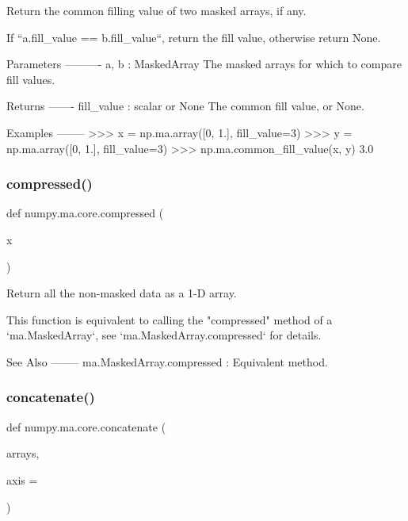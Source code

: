 \begin{DoxyVerb}Return the common filling value of two masked arrays, if any.

If ``a.fill_value == b.fill_value``, return the fill value,
otherwise return None.

Parameters
----------
a, b : MaskedArray
    The masked arrays for which to compare fill values.

Returns
-------
fill_value : scalar or None
    The common fill value, or None.

Examples
--------
>>> x = np.ma.array([0, 1.], fill_value=3)
>>> y = np.ma.array([0, 1.], fill_value=3)
>>> np.ma.common_fill_value(x, y)
3.0\end{DoxyVerb}
 \mbox{\label{namespacenumpy_1_1ma_1_1core_a2b4b4b816bb642b0b523350e0857a255}} 
\subsubsection{\texorpdfstring{compressed()}{compressed()}}
{\footnotesize\ttfamily def numpy.\+ma.\+core.\+compressed (\begin{DoxyParamCaption}\item[{}]{x }\end{DoxyParamCaption})}

\begin{DoxyVerb}Return all the non-masked data as a 1-D array.

This function is equivalent to calling the "compressed" method of a
`ma.MaskedArray`, see `ma.MaskedArray.compressed` for details.

See Also
--------
ma.MaskedArray.compressed : Equivalent method.\end{DoxyVerb}
 \mbox{\label{namespacenumpy_1_1ma_1_1core_a9188e3406ca26ea14043aca2be3b43c2}} 
\subsubsection{\texorpdfstring{concatenate()}{concatenate()}}
{\footnotesize\ttfamily def numpy.\+ma.\+core.\+concatenate (\begin{DoxyParamCaption}\item[{}]{arrays,  }\item[{}]{axis = {} }\end{DoxyParamCaption})}


